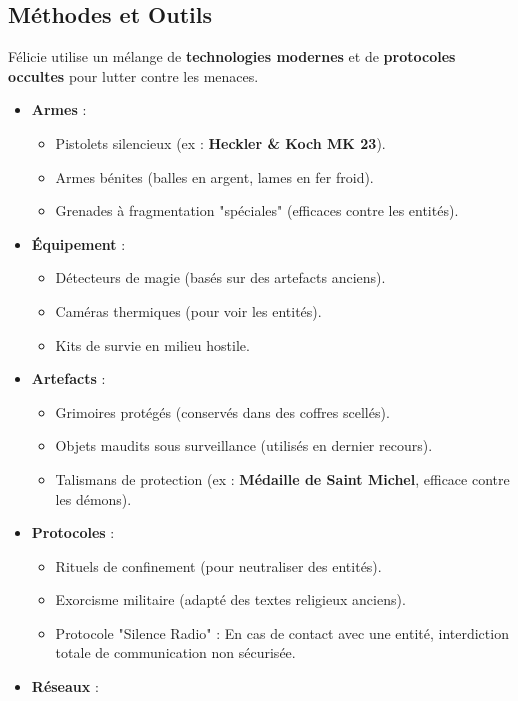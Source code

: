 \documentclass[10pt,a5paper,twoside]{book}
\begin{document}
\newpage

\subsection{Méthodes et Outils}
Félicie utilise un mélange de \textbf{technologies modernes} et de \textbf{protocoles occultes} pour lutter contre les menaces.

\begin{itemize}
	\item \textbf{Armes} :
	\begin{itemize}
		\item Pistolets silencieux (ex : \textbf{Heckler \& Koch MK 23}).
		\item Armes bénites (balles en argent, lames en fer froid).
		\item Grenades à fragmentation "spéciales" (efficaces contre les entités).
	\end{itemize}
	\item \textbf{Équipement} :
	\begin{itemize}
		\item Détecteurs de magie (basés sur des artefacts anciens).
		\item Caméras thermiques (pour voir les entités).
		\item Kits de survie en milieu hostile.
	\end{itemize}
	\item \textbf{Artefacts} :
	\begin{itemize}
		\item Grimoires protégés (conservés dans des coffres scellés).
		\item Objets maudits sous surveillance (utilisés en dernier recours).
		\item Talismans de protection (ex : \textbf{Médaille de Saint Michel}, efficace contre les démons).
	\end{itemize}
	\item \textbf{Protocoles} :
	\begin{itemize}
		\item Rituels de confinement (pour neutraliser des entités).
		\item Exorcisme militaire (adapté des textes religieux anciens).
		\item Protocole "Silence Radio" : En cas de contact avec une entité, interdiction totale de communication non sécurisée.
	\end{itemize}
	\item \textbf{Réseaux} :
	\begin{itemize}

\end{itemize}
\end{itemize}
\end{document}
